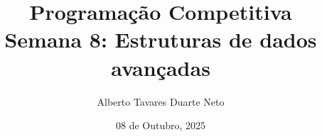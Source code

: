 \documentclass{beamer}
\title{{\Large Programação Competitiva}\\ Semana 8: Estruturas de dados avançadas}
\date{08 de Outubro, 2025}
\author{Alberto Tavares Duarte Neto}
\institute{Universidade de Brasília}
\numberwithin{equation}{subsection}
\begin{document}
    \maketitle
    \small

    
    
    
    
    
    
    
    
    
    
    
    
    


    
    
    
    
    
\end{document}
